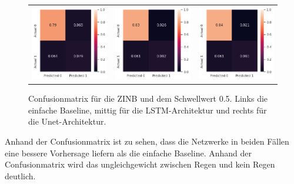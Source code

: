 \begin{figure}[h]
\begin{tabular}{ccc}
\includegraphics[width=45mm]{abb/simpleBaseLine.png}&
\includegraphics[width=45mm]{abb/znBinomConfusion_LSTM.png}&
\includegraphics[width=45mm]{abb/znBinomConfusion_UNET.png}
\end{tabular}
\caption{Confusionmatrix für die ZINB und dem Schwellwert 0.5. Links die einfache Baseline, mittig für die LSTM-Architektur und rechts für die Unet-Architektur. \label{fig:confusionmatrix_binom}}
\end{figure}

\noindent Anhand der Confusionmatrix ist zu sehen, dass die Netzwerke in beiden Fällen eine bessere Vorhersage liefern als die einfache Baseline. 
Anhand der Confusionmatrix wird das ungleichgewicht zwischen Regen und kein Regen deutlich. 

